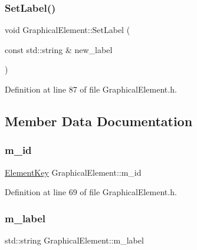 \subsubsection{\texorpdfstring{Set\+Label()}{SetLabel()}}
{\footnotesize\ttfamily void Graphical\+Element\+::\+Set\+Label (\begin{DoxyParamCaption}\item[{const std\+::string \&}]{new\+\_\+label }\end{DoxyParamCaption})\hspace{0.3cm}{\ttfamily [inline]}}



Definition at line 87 of file Graphical\+Element.\+h.



\subsection{Member Data Documentation}
\mbox{\label{class_graphical_element_a03d7e29a10d456a4944ce06c6964d15a}} 
\subsubsection{\texorpdfstring{m\+\_\+id}{m\_id}}
{\footnotesize\ttfamily \hyperlink{_graphical_element_8h_ade5fd6c85839a416577ff9de1605141e}{Element\+Key} Graphical\+Element\+::m\+\_\+id\hspace{0.3cm}{\ttfamily [protected]}}



Definition at line 69 of file Graphical\+Element.\+h.

\mbox{\label{class_graphical_element_ae7f90a74fb05130a8bb97617b433c918}} 
\subsubsection{\texorpdfstring{m\+\_\+label}{m\_label}}
{\footnotesize\ttfamily std\+::string Graphical\+Element\+::m\+\_\+label\hspace{0.3cm}{\ttfamily [protected]}}



